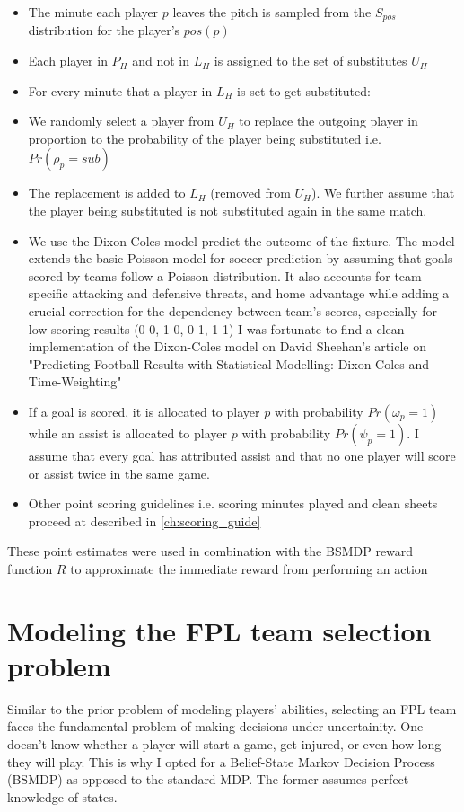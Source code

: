 \begin{itemize}
    \item The minute each player $p$ leaves the pitch is sampled from the $S_{pos}$ distribution for the player's $pos(p)$
    \item Each player in $P_H$ and not in $L_H$ is assigned to the set of substitutes $U_H$
    \item For every minute that a player in $L_H$ is set to get substituted:
        \item We randomly select a player from $U_H$ to replace the outgoing player in proportion to the probability of the player being substituted i.e. $Pr(\rho_p = sub)$
        \item The replacement is added to $L_H$ (removed from $U_H$). We further assume that the player being substituted is not substituted again in the same match.
    \item We use the Dixon-Coles model \cite{dixon1997} predict the outcome of the fixture. The model extends the basic Poisson model for soccer prediction by assuming that goals scored by teams follow a Poisson distribution. It also accounts for team-specific attacking and defensive threats, and home advantage while adding a crucial correction for the dependency between team's scores, especially for low-scoring results (0-0, 1-0, 0-1, 1-1) I was fortunate to find a clean implementation of the Dixon-Coles model on David Sheehan's article on "Predicting Football Results with Statistical Modelling: Dixon-Coles and Time-Weighting" \cite{sheehan2018}
    \item If a goal is scored, it is allocated to player $p$ with probability $Pr(\omega_p = 1)$ while an assist is allocated to player $p$ with probability $Pr(\psi_p = 1)$. I assume that every goal has attributed assist and that no one player will score or assist twice in the same game.
    
    \item Other point scoring guidelines i.e. scoring minutes played and clean sheets proceed at described in \ref{ch:scoring_guide}
\end{itemize}
These point estimates were used in combination with the BSMDP reward function $R$ to approximate the immediate reward from performing an action

\section{Modeling the FPL team selection problem}
Similar to the prior problem of modeling players' abilities, selecting an FPL team faces the fundamental problem of making decisions under uncertainity. One doesn't know whether a player will start a game, get injured, or even how long they will play. This is why I opted for a Belief-State Markov Decision Process (BSMDP) as opposed to the standard MDP. The former assumes perfect knowledge of states.

